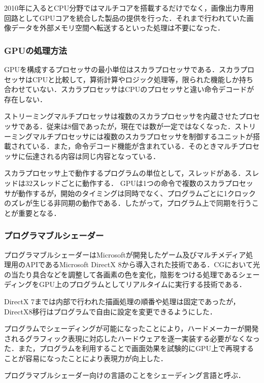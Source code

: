 \documentclass[a4j,12pt]{jsarticle}
\begin{document}
2010年に入るとCPU分野ではマルチコアを搭載するだけでなく，画像出力専用回路としてGPUコアを統合した製品の提供を行った．それまで行われていた画像データを外部メモリ空間へ転送するといった処理は不要になった．

\subsubsection{GPUの処理方法}
GPUを構成するプロセッサの最小単位はスカラプロセッサである．スカラプロセッサはCPUと比較して，算術計算やロジック処理等，限られた機能しか持ち合わせていない．スカラプロセッサはCPUのプロセッサと違い命令デコードが存在しない．

ストリーミングマルチプロセッサは複数のスカラプロセッサを内蔵させたプロセッサである．従来は8個であったが，現在では数が一定ではなくなった．ストリーミングマルチプロセッサには複数のスカラプロセッサを制御するユニットが搭載されている．また，命令デコード機能が含まれている．そのときマルチプロセッサに伝達される内容は同じ内容となっている．

スカラプロセッサ上で動作するプログラムの単位として，スレッドがある．スレッドは32スレッドごとに動作する．
GPUは1つの命令で複数のスカラプロセッサが動作するが，開始のタイミングは同時でなく、プログラムごとに1クロックのズレが生じる非同期の動作である．したがって，プログラム上で同期を行うことが重要となる．

\subsubsection{プログラマブルシェーダー}
プログラマブルシェーダーはMicrosoftが開発したゲーム及びマルチメディア処理用のAPIであるMicrosoft DirectX 8から導入された技術である．CGにおいて光の当たり具合などを調整して各画素の色を変化，陰影をつける処理であるシェーディングをGPU上のプログラムとしてリアルタイムに実行する技術である．

DirectX 7までは内部で行われた描画処理の順番や処理は固定であったが，DirectX8移行はプログラムで自由に設定を変更できるようにした．

プログラムでシェーディングが可能になったことにより，ハードメーカーが開発されるグラフィック表現に対応したハードウェアを逐一実装する必要がなくなった．また，プログラムを利用することで画面効果を試験的にGPU上で再現することが容易になったことにより表現力が向上した．

プログラマブルシェーダー向けの言語のことをシェーディング言語と呼ぶ．
\end{document}
